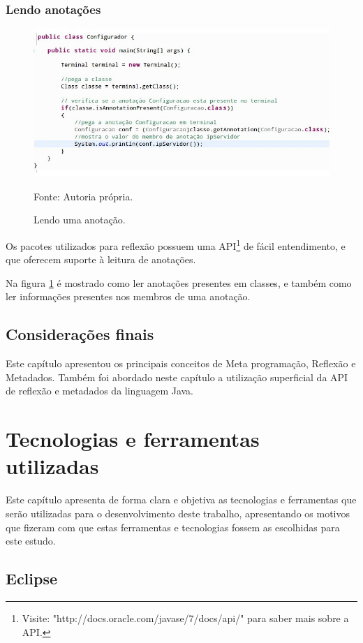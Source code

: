 \documentclass[tc,oneside]{iiufrgs}
\begin{document}
\subsection{Lendo anotações}
\begin{figure}[ht]
	\centering
	\includegraphics[scale=0.5]{figuras/lendoAnnotation.jpg}
	\caption{Lendo uma anotação.}
	\small{Fonte: Autoria própria.}
	\label{fig:lendoAnotacao}
\end{figure}
Os pacotes utilizados para reflexão possuem uma API\footnote{Visite: "http://docs.oracle.com/javase/7/docs/api/"  para saber mais sobre a API.} de fácil entendimento, e que oferecem suporte à leitura de anotações.

Na figura \ref{fig:lendoAnotacao} é mostrado como ler anotações presentes em classes, e também como ler informações presentes nos membros de uma anotação.

\section{Considerações finais}
Este capítulo apresentou os principais conceitos de Meta programação, Reflexão e Metadados. Também foi abordado neste capítulo a utilização superficial da API de reflexão e metadados da linguagem Java. 

\chapter{Tecnologias e ferramentas utilizadas}
Este capítulo apresenta  de forma clara e objetiva as tecnologias e ferramentas que serão utilizadas para o desenvolvimento deste trabalho, apresentando os motivos que fizeram com que estas ferramentas e tecnologias fossem as escolhidas para este estudo.

\section{Eclipse}
\end{document}
